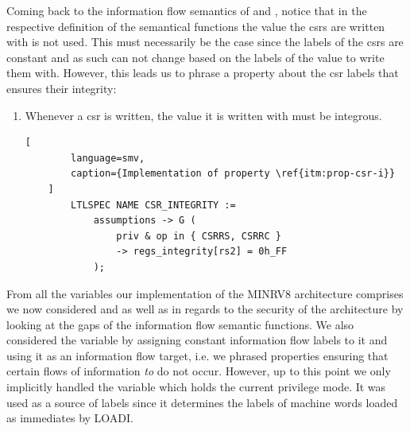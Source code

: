 Coming back to the information flow semantics of  and , notice that in the respective definition of the semantical functions the value the \glspl{csr} are written with is not used.
This must necessarily be the case since the labels of the \glspl{csr} are constant and as such can not change based on the labels of the value to write them with.
However, this leads us to phrase a property about the \gls{csr} labels that ensures their integrity:
\begin{enumerate}[label=\Roman*.,resume]
    \item \label{itm:prop-csr-i}
    Whenever a \gls{csr} is written, the value it is written with must be integrous.

    \begin{lstlisting}[
        language=smv,
        caption={Implementation of property \ref{itm:prop-csr-i}}
    ]
        LTLSPEC NAME CSR_INTEGRITY :=
            assumptions -> G (
                priv & op in { CSRRS, CSRRC }
                -> regs_integrity[rs2] = 0h_FF
            );
    \end{lstlisting}
\end{enumerate}

From all the variables our implementation of the MINRV8 architecture comprises we now considered  and  as well as  in regards to the security of the architecture by looking at the gaps of the information flow semantic functions.
We also considered the variable  by assigning constant information flow labels to it and using it as an information flow target, i.e. we phrased properties ensuring that certain flows of information \textit{to}  do not occur.
However, up to this point we only implicitly handled the  variable which holds the current privilege mode.
It was used as a source of labels since it determines the labels of machine words loaded as immediates by LOADI.

